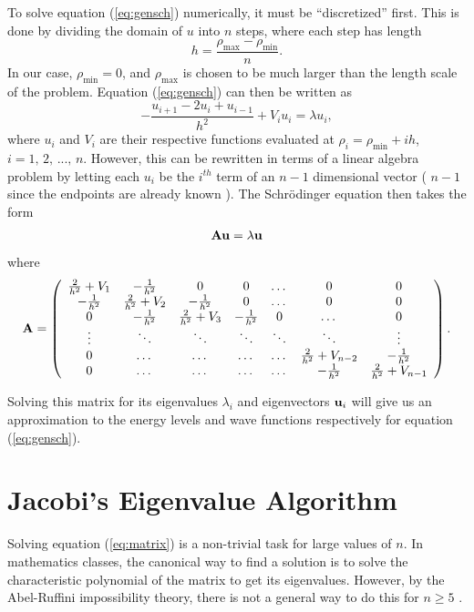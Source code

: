 \documentclass[a4paper,12pt]{report}
\begin{document}
To solve equation (\ref{eq:gensch}) numerically, it must be ``discretized'' first. This is done by dividing the domain of $u$ into $n$ steps, where each step has length
\[
 h = \frac{\rho_{\mathrm{max}}-\rho_{\mathrm{min}}}{n}.
\]
In our case, $\rho_{\mathrm{min}} = 0$, and $\rho_{\mathrm{max}}$ is chosen to be much larger than the length scale of the problem. Equation (\ref{eq:gensch}) can then be written as \cite{Landau:2008}
\begin{equation}
 -\frac{u_{i+1} -2u_i +u_{i-1} }{h^2}+V_iu_i = \lambda u_i,
\end{equation}
where $u_i$ and $V_i$ are their respective functions evaluated at $\rho_i = \rho_{\mathrm{min}}+ih$, $i = 1,\,2,\,...,\,n$. However, this can be rewritten in terms of a linear algebra problem by letting each $u_i$ be the $i^{th}$ term of an $n-1$ dimensional vector ( $n-1$ since the endpoints are already known ). The Schr\"odinger equation then takes the form 
\begin{equation}
 {\bf A}{\bf u} = \lambda {\bf u}
\end{equation}
where
\begin{equation} \label{eq:matrix}
    {\bf A}=\left( 
    \begin{array}{ccccccc}
    \frac{2}{h^2}+V_1 & -\frac{1}{h^2} & 0   & 0    & \dots  &0     & 0 \\
    -\frac{1}{h^2} & \frac{2}{h^2}+V_2 & -\frac{1}{h^2} & 0    & \dots  &0     &0 \\
     0   & -\frac{1}{h^2} & \frac{2}{h^2}+V_3 & -\frac{1}{h^2}  &0       &\dots & 0\\
     \vdots  & \ddots & \ddots & \ddots  &\ddots      &\ddots & \vdots\\
     0   & \dots & \dots & \dots  &\dots       &\frac{2}{h^2}+V_{n-2} & -\frac{1}{h^2}\\
     0   & \dots & \dots & \dots  &\dots       &-\frac{1}{h^2} & \frac{2}{h^2}+V_{n-1}
     \end{array} 
     \right).
\end{equation} 

Solving this matrix for its eigenvalues $\lambda_i$ and eigenvectors ${\bf u}_i$ will give us an approximation to the energy levels and wave functions respectively for equation (\ref{eq:gensch}).

\section{Jacobi's Eigenvalue Algorithm}\label{sec:jacobi}
Solving equation (\ref{eq:matrix}) is a non-trivial task for large values of $n$. In mathematics classes, the canonical way to find a solution is to solve the characteristic polynomial of the matrix to get its eigenvalues. However, by the Abel-Ruffini impossibility theory, there is not a general way to do this for $n\geq 5$ \cite{dux:2016}. 
\end{document}
